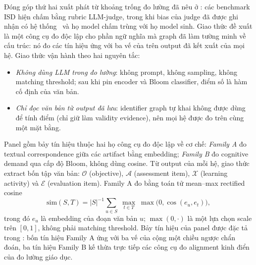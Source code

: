 Đóng góp thứ hai xuất phát từ khoảng trống đo lường đã nêu ở
: các benchmark ISD hiện chấm bằng rubric LLM-judge,
trong khi bias của judge đã được ghi nhận có hệ
thống~\cite{zheng2023judging,panickssery2024llm,norman2026reliability} và họ
model chấm trùng với họ model sinh. Giao thức đề xuất là một công cụ đo độc
lập cho phần ngữ nghĩa mà graph đã làm tường minh về cấu trúc: nó đo các tín
hiệu ứng với ba vế của  trên output đã kết xuất của mọi hệ.
Giao thức vận hành theo hai nguyên tắc:
\begin{itemize}
  \item \emph{Không dùng LLM trong đo lường}: không prompt, không sampling,
  không matching threshold; sau khi pin encoder và Bloom classifier, điểm số là
  hàm cố định của văn bản.
  \item \emph{Chỉ đọc văn bản từ output đã lưu}: identifier graph tự khai không
  được dùng để tính điểm (chỉ giữ làm validity evidence), nên mọi hệ được đo
  trên cùng một mặt bằng.
\end{itemize}

Panel gồm bảy tín hiệu thuộc hai họ công cụ đo độc lập về cơ chế:
\emph{Family A} đo textual correspondence giữa các artifact bằng embedding;
\emph{Family B} đo cognitive demand qua cấp độ Bloom, không dùng cosine. Từ
output của mỗi hệ, giao thức extract bốn tập văn bản: $\mathcal{O}$
(objective), $\mathcal{A}$ (assessment item), $\mathcal{X}$ (learning activity)
và $\mathcal{E}$ (evaluation item). Family A đo bằng toán tử mean--max
rectified cosine
\[
  \mathrm{sim}(S,T)
  = |S|^{-1}\sum_{u\in S}\;\max_{t\in T}\;\max\bigl(0,\cos(e_u,e_t)\bigr),
\]
trong đó $e_u$ là embedding của đoạn văn bản $u$; $\max(0,\cdot)$ là một lựa
chọn scale trên $[0,1]$, không phải matching threshold. Bảy tín hiệu của panel
được đặc tả trong : bốn tín hiệu Family A ứng với ba vế
của  cộng một chiều ngược chẩn đoán, ba tín hiệu Family B kế
thừa trực tiếp các công cụ đo alignment kinh điển của đo lường giáo dục.

